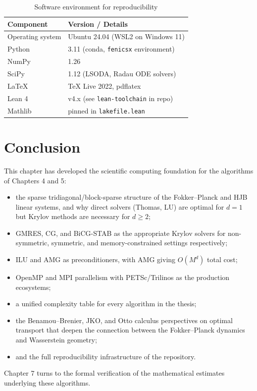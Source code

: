 \begin{table}[ht]
\centering
\caption{Software environment for reproducibility}
\label{tab:environment}
\begin{tabular}{ll}
\toprule
\textbf{Component} & \textbf{Version / Details} \\
\midrule
Operating system & Ubuntu 24.04 (WSL2 on Windows 11) \\
Python & 3.11 (conda, \texttt{fenicsx} environment) \\
NumPy & 1.26 \\
SciPy & 1.12 (LSODA, Radau ODE solvers) \\
\LaTeX & TeX Live 2022, pdflatex \\
Lean 4 & v4.x (see \texttt{lean-toolchain} in repo) \\
Mathlib & pinned in \texttt{lakefile.lean} \\
\bottomrule
\end{tabular}
\end{table}

\section{Conclusion}

This chapter has developed the scientific computing foundation for the algorithms
of Chapters 4 and 5:
\begin{itemize}
    \item the sparse tridiagonal/block-sparse structure of the Fokker--Planck
    and HJB linear systems, and why direct solvers (Thomas, LU) are optimal
    for $d=1$ but Krylov methods are necessary for $d \ge 2$;
    \item GMRES, CG, and BiCG-STAB as the appropriate Krylov solvers for
    non-symmetric, symmetric, and memory-constrained settings respectively;
    \item ILU and AMG as preconditioners, with AMG giving $O(M^d)$ total cost;
    \item OpenMP and MPI parallelism with PETSc/Trilinos as the production
    ecosystems;
    \item a unified complexity table for every algorithm in the thesis;
    \item the Benamou--Brenier, JKO, and Otto calculus perspectives on optimal
    transport that deepen the connection between the Fokker--Planck dynamics
    and Wasserstein geometry;
    \item and the full reproducibility infrastructure of the repository.
\end{itemize}
Chapter 7 turns to the formal verification of the mathematical estimates
underlying these algorithms.
